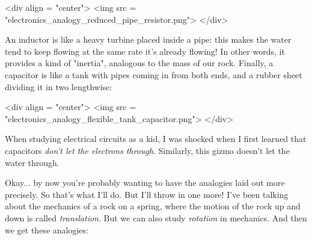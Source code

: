 <div align = "center">
<img src = "electronics_analogy_reduced_pipe_resistor.png">
</div>

An inductor is like a heavy turbine placed inside a pipe: this makes
the water tend to keep flowing at the same rate it's already flowing!
In other words, it provides a kind of "inertia", analogous
to the mass of our rock.  Finally, a capacitor is like a tank with
pipes coming in from both ends, and a rubber sheet dividing it in two
lengthwise:

<div align = "center">
<img src = "electronics_analogy_flexible_tank_capacitor.png">
</div>

When studying electrical circuits as a kid, I was shocked when I first
learned that capacitors \emph{don't let the electrons through}.
Similarly, this gizmo doesn't let the water through.

Okay... by now you're probably wanting to have the analogies laid out
more precisely.  So that's what I'll do.  But I'll throw in one more!
I've been talking about the mechanics of a rock on a spring, where the
motion of the rock up and down is called \emph{translation}.  But we can
also study \emph{rotation} in mechanics.  And then we get these analogies:




